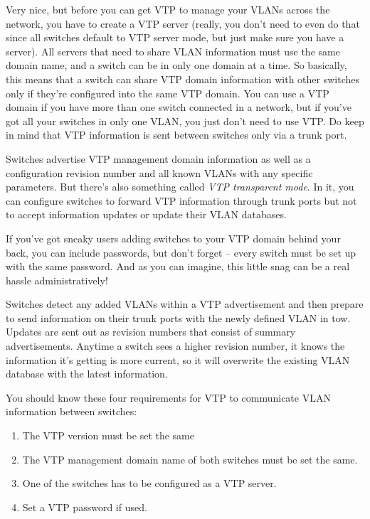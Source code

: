 \documentclass[b5paper,11pt]{memoir}
\begin{document}
Very nice, but before you can get VTP to manage your VLANs across the
network, you have to create a VTP server (really, you don't need to even
do that since all switches default to VTP server mode, but just make
sure you have a server). All servers that need to share VLAN information
must use the same domain name, and a switch can be in only one domain at
a time. So basically, this means that a switch can share VTP domain
information with other switches only if they're configured into the same
VTP domain. You can use a VTP domain if you have more than one switch
connected in a network, but if you've got
all your switches in
only one VLAN, you just don't need to use VTP. Do keep in mind that VTP
information is sent between switches only via a trunk port.

Switches advertise VTP management domain information as well as a
configuration revision number and all known VLANs with any specific
parameters. But there's also something called \emph{VTP transparent
mode}. In it, you can configure switches to forward VTP information
through trunk ports but not to accept information updates or update
their VLAN databases.

If you've got sneaky users adding switches to your VTP domain behind
your back, you can include passwords, but don't forget -- every switch
must be set up with the same password. And as you can imagine, this
little snag can be a real hassle administratively!

Switches detect any added VLANs within a VTP advertisement and then
prepare to send information on their trunk ports with the newly defined
VLAN in tow. Updates are sent out as revision numbers that consist of
summary advertisements. Anytime a switch sees a higher revision number,
it knows the information it's getting is more current, so it will
overwrite the existing VLAN database with the latest information.

You should know these four requirements for VTP to communicate VLAN
information between switches:

\begin{enumerate}
\tightlist
\item
  The VTP version must be set the same
\item
  The VTP management domain name of both switches must be set the same.
\item
  One of the switches has to be configured as a VTP server.
\item
  Set a VTP password if used.
\end{enumerate}
\end{document}
